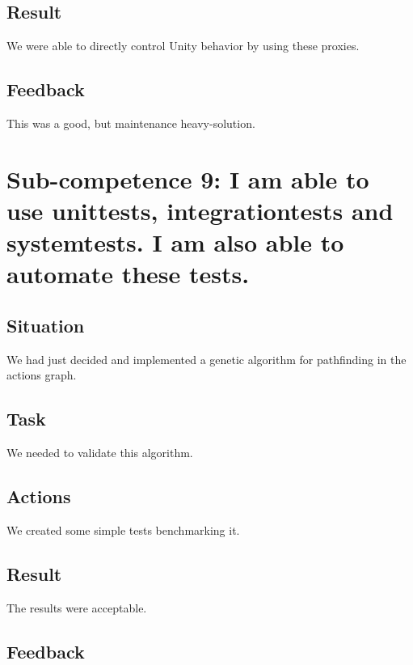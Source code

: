 \documentclass[11pt]{article}
\begin{document}
\subsection{Result}
We were able to directly control Unity behavior by using these proxies.
\subsection{Feedback}
This was a good, but maintenance heavy-solution.



\newpage
\section{Sub-competence 9:  I am able to use unittests,
integrationtests and systemtests.
I am also able to
automate these tests.  } 
\subsection{Situation}
We had just decided and implemented a genetic algorithm for pathfinding in the actions graph.
\subsection{Task}
We needed to validate this algorithm.
\subsection{Actions}
We created some simple tests benchmarking it.
\subsection{Result}
The results were acceptable.
\subsection{Feedback}
\end{document}
